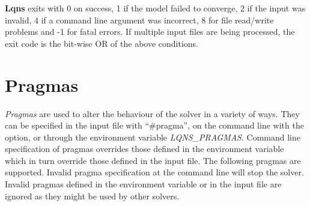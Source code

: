 \textbf{Lqns} exits with 0 on success, 1 if the model failed to converge,
2 if the input was invalid, 4 if a command line argument was
incorrect, 8 for file read/write problems and -1 for fatal errors.  If
multiple input files are being processed, the exit code is the
bit-wise OR of the above conditions.
\section{Pragmas}
\label{sec:lqns-pragmas}
\emph{Pragmas} are used to alter the behaviour of the solver in a
variety of ways.  They can be specified in the input file with
``\#pragma'', on the command line with the  option, or through
the environment variable \emph{LQNS\_PRAGMAS}.  Command line
specification of pragmas overrides those defined in the environment
variable which in turn override those defined in the input file.  The
following pragmas are supported.  Invalid pragma specification at the
command line will stop the solver.  Invalid pragmas defined in the
environment variable or in the input file are ignored as they might be
used by other solvers.

